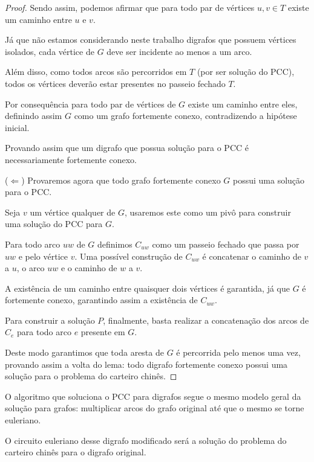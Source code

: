 \begin{proof}
        Sendo assim, podemos afirmar que para todo par de vértices $u, v \in T$ existe um caminho entre $u$ e $v$.

        Já que não estamos considerando neste trabalho digrafos que possuem vértices isolados, cada vértice de $G$ deve ser incidente ao menos a um arco. 

        Além disso, como todos arcos são percorridos em $T$ (por ser solução do PCC), todos os vértices deverão estar presentes no passeio fechado $T$.

        Por consequência para todo par de vértices de $G$ existe um caminho entre eles, definindo assim $G$ como um grafo fortemente conexo, contradizendo a hipótese inicial.

        Provando assim que um digrafo que possua solução para o PCC é necessariamente fortemente conexo. 

        ($\Leftarrow$)  Provaremos agora que todo grafo fortemente conexo $G$ possui uma solução para o PCC.

        Seja $v$ um vértice qualquer de $G$, usaremos este como um pivô para construir uma solução do PCC para $G$. 

        Para todo arco $uw$ de $G$ definimos $C_{uw}$ como um passeio fechado que passa por $uw$ e pelo vértice $v$. 
        Uma possível construção de $C_{uw}$ é concatenar o caminho de $v$ a $u$, o arco $uw$ e o caminho de $w$ a $v$.
        
        A existência de um caminho entre quaisquer dois vértices é garantida, já que $G$ é fortemente conexo, garantindo assim a existência de $C_{uw}$.
        
        Para construir a solução $P$, finalmente, basta realizar a concatenação dos arcos de $C_{e}$ para todo arco $e$ presente em $G$.

        Deste modo garantimos que toda aresta de $G$ é percorrida pelo menos uma vez, provando assim a volta do lema: todo digrafo fortemente conexo possui uma solução para o problema do carteiro chinês.

    \end{proof}

    O algoritmo que soluciona o PCC para digrafos segue o mesmo modelo geral da solução para grafos: multiplicar arcos do grafo original até que o mesmo se torne euleriano. 

    O circuito euleriano desse digrafo modificado será a solução do problema do carteiro chinês para o digrafo original.
    
